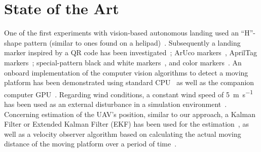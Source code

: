 \documentclass[conference]{IEEEtran}
\begin{document}
\section{State of the Art}
\label{sec:state-of-the-art}


One of the first experiments with
vision-based autonomous landing used
an ``H''-shape
pattern (similar to ones found on a helipad)~\cite{saripalli2002vision}. Subsequently
a landing marker inspired by a QR code has been
investigated~\cite{yuan2018hierarchical};
ArUco markers~\cite{lee2012autonomous,yang2018hybrid}, AprilTag markers~\cite{araar2017vision,kyristsis2016towards,feng2018autonomous,olson2011apriltag}; special-pattern black and white markers~\cite{nguyen2018lightdenseyolo,falanga2017vision}, and color markers~\cite{chen2016system,lee2016vision}.  
An onboard implementation of the computer vision algorithms to detect a moving platform has been demonstrated using standard CPU~\cite{chen2016system,lee2016vision} as well as the companion computer GPU~\cite{falanga2017visionyang2018hybrid,nguyen2018lightdenseyolo,kyristsis2016towards}.
% 
Regarding wind conditions, 
a constant wind speed of \SI{5}{\m \per \s} has been used as an external disturbance in a
simulation environment~\cite{feng2018autonomous}. 
%
Concerning estimation of the UAV's position,
similar to our approach, a Kalman Filter or Extended Kalman Filter (EKF) has been used for the
estimation~\cite{saripalli2003landing,araar2017vision,feng2018autonomous,
  falanga2017vision}, as well as a velocity observer algorithm based on calculating the actual
moving distance of the moving platform over a period of time~\cite{yang2018hybrid}.
\end{document}

